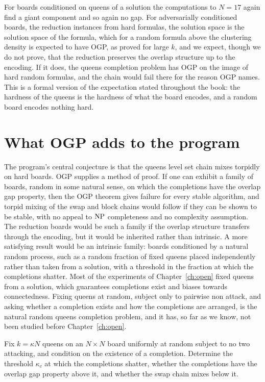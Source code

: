 For boards conditioned on queens of a solution the computations to $N = 17$ again find a giant component and so again no gap. For adversarially conditioned boards, the reduction instances from hard formulas, the solution space is the solution space of the formula, which for a random formula above the clustering density is expected to have OGP, as proved for large $k$, and we expect, though we do not prove, that the reduction preserves the overlap structure up to the encoding. If it does, the queens completion problem has OGP on the image of hard random formulas, and the chain would fail there for the reason OGP names. This is a formal version of the expectation stated throughout the book: the hardness of the queens is the hardness of what the board encodes, and a random board encodes nothing hard.

\section{What OGP adds to the program}

The program's central conjecture is that the queens level set chain mixes torpidly on hard boards. OGP supplies a method of proof. If one can exhibit a family of boards, random in some natural sense, on which the completions have the overlap gap property, then the OGP theorem gives failure for every stable algorithm, and torpid mixing of the swap and block chains would follow if they can be shown to be stable, with no appeal to $\mathrm{NP}$ completeness and no complexity assumption. The reduction boards would be such a family if the overlap structure transfers through the encoding, but it would be inherited rather than intrinsic. A more satisfying result would be an intrinsic family: boards conditioned by a natural random process, such as a random fraction of fixed queens placed independently rather than taken from a solution, with a threshold in the fraction at which the completions shatter. Most of the experiments of Chapter~\ref{ch:open} fixed queens from a solution, which guarantees completions exist and biases towards connectedness. Fixing queens at random, subject only to pairwise non attack, and asking whether a completion exists and how the completions are arranged, is the natural random queens completion problem, and it has, so far as we know, not been studied before Chapter~\ref{ch:open}.

\begin{problem}
Fix $k = \kappa N$ queens on an $N \times N$ board uniformly at random subject to no two attacking, and condition on the existence of a completion. Determine the threshold $\kappa_c$ at which the completions shatter, whether the completions have the overlap gap property above it, and whether the swap chain mixes below it.
\end{problem}

